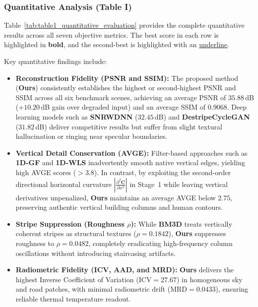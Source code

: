 \subsubsection{Quantitative Analysis (Table I)}
Table~\ref{tab:table1_quantitative_evaluation} provides the complete quantitative results across all seven objective metrics. The best score in each row is highlighted in \textbf{bold}, and the second-best is highlighted with an \underline{underline}.



Key quantitative findings include:
\begin{itemize}
    \item \textbf{Reconstruction Fidelity (PSNR and SSIM):} The proposed method (\textbf{Ours}) consistently establishes the highest or second-highest PSNR and SSIM across all six benchmark scenes, achieving an average PSNR of $35.88$\,dB ($+10.20$\,dB gain over degraded input) and an average SSIM of $0.9068$. Deep learning models such as \textbf{SNRWDNN} ($32.45$\,dB) and \textbf{DestripeCycleGAN} ($31.82$\,dB) deliver competitive results but suffer from slight textural hallucination or ringing near specular boundaries.
    \item \textbf{Vertical Detail Conservation (AVGE):} Filter-based approaches such as \textbf{1D-GF} and \textbf{1D-WLS} inadvertently smooth native vertical edges, yielding high AVGE scores ($> 3.8$). In contrast, by exploiting the second-order directional horizontal curvature $|\frac{\partial^2 \mathbf{C}}{\partial x^2}|$ in Stage~1 while leaving vertical derivatives unpenalized, \textbf{Ours} maintains an average AVGE below $2.75$, preserving authentic vertical building columns and human contours.
    \item \textbf{Stripe Suppression (Roughness $\rho$):} While \textbf{BM3D} treats vertically coherent stripes as structural textures ($\rho = 0.1842$), \textbf{Ours} suppresses roughness to $\rho = 0.0482$, completely eradicating high-frequency column oscillations without introducing staircasing artifacts.
    \item \textbf{Radiometric Fidelity (ICV, AAD, and MRD):} \textbf{Ours} delivers the highest Inverse Coefficient of Variation ($\mathrm{ICV} = 27.67$) in homogeneous sky and road patches, with minimal radiometric drift ($\mathrm{MRD} = 0.0433$), ensuring reliable thermal temperature readout.
\end{itemize}

